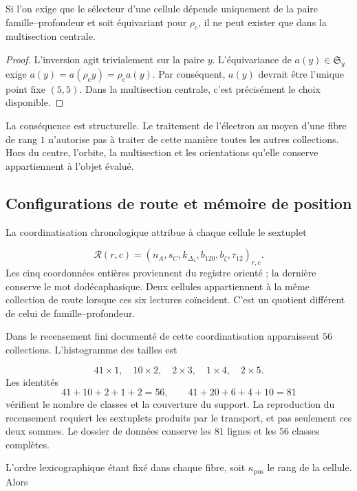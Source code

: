 \begin{proposition}
Si l’on exige que le sélecteur d’une cellule dépende uniquement de la paire
famille--profondeur et soit équivariant pour \(\rho_{\mathrm c}\), il ne
peut exister que dans la multisection centrale.

\end{proposition}
\begin{proof}
L’inversion agit trivialement sur la paire \(y\). L’équivariance de
\(a(y)\in\mathfrak S_y\) exige
\(a(y)=a(\rho_{\mathrm c}y)=\rho_{\mathrm c}a(y)\).
Par conséquent, \(a(y)\) devrait être l’unique point fixe \((5,5)\).
Dans la multisection centrale, c’est précisément le choix disponible.

\end{proof}

La conséquence est structurelle. Le traitement de l’électron au moyen d’une
fibre de rang \(1\) n’autorise pas à traiter de cette manière toutes les autres
collections. Hors du centre, l’orbite, la multisection et les orientations
qu’elle conserve appartiennent à l’objet évalué.


\subsection{Configurations de route et mémoire de position
}

La coordinatisation chronologique attribue à chaque cellule le sextuplet

\[
 \mathcal R(r,c)=
 (n_A,s_C,k_{\Delta_4},b_{120},b_{\zeta},\tau_{12})_{r,c}.
\]
Les cinq coordonnées entières proviennent du registre orienté ; la dernière
conserve le mot dodécaphasique. Deux cellules appartiennent à la même collection
de route lorsque ces six lectures coïncident. C’est un quotient différent
de celui de famille--profondeur.


Dans le recensement fini documenté de cette coordinatisation apparaissent \(56\) collections.
L’histogramme des tailles est

\[
 41\times1,\quad10\times2,\quad2\times3,\quad1\times4,\quad2\times5.
\]
Les identités
\[
 41+10+2+1+2=56,\qquad
 41+20+6+4+10=81
\]
vérifient le nombre de classes et la couverture du support. La reproduction
du recensement requiert les sextuplets produits par le transport, et pas seulement ces
deux sommes. Le dossier de données conserve les \(81\) lignes et les
\(56\) classes complètes.


L’ordre lexicographique étant fixé dans chaque fibre, soit \(\kappa_{\mathrm{pos}}\)
le rang de la cellule. Alors

